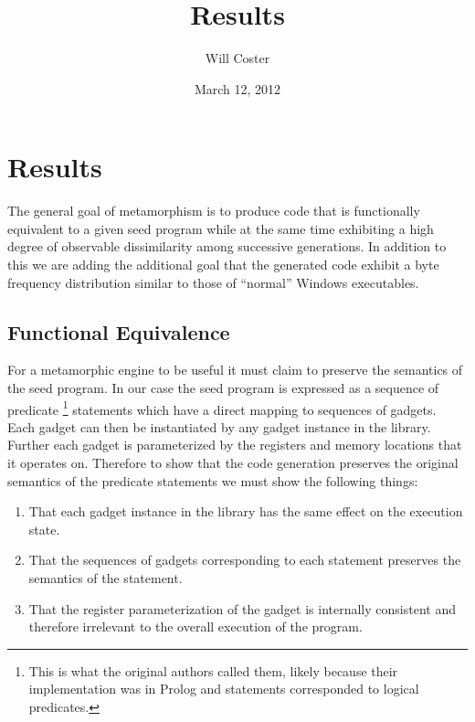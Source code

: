 \documentclass[finalcopy,short]{srpaper}
\title{Results}
\author{Will Coster}
\date{March 12, 2012}
\begin{document}
    \frontmatter

    \chapter{Results}

        The general goal of metamorphism is to produce code that is functionally
        equivalent to a given seed program while at the same time exhibiting a
        high degree of observable dissimilarity among successive generations.
        In addition to this we are adding the additional goal that the generated
        code exhibit a byte frequency distribution similar to those of
        ``normal'' Windows executables.

    \section{Functional Equivalence}

        For a metamorphic engine to be useful it must claim to preserve the
        semantics of the seed program. In our case the seed program is expressed
        as a sequence of predicate \footnote{This is what the original authors
            called them, likely because their implementation was in Prolog and
        statements corresponded to logical predicates.} statements which have a
        direct mapping to sequences of gadgets. Each gadget can then be
        instantiated by any gadget instance in the library. Further each gadget
        is parameterized by the registers and memory locations that it operates
        on. Therefore to show that the code generation preserves the original
        semantics of the predicate statements we must show the following things:

        \begin{enumerate}

            \item That each gadget instance in the library has the same effect
                on the execution state.

            \item That the sequences of gadgets corresponding to each statement
                preserves the semantics of the statement.

            \item That the register parameterization of the gadget is internally
                consistent and therefore irrelevant to the overall execution of
                the program.

        \end{enumerate}
\end{document}
